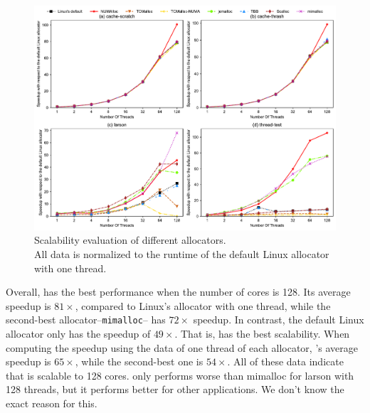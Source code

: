 \begin{figure}[!th]
    \centering
    \includegraphics[width=\textwidth]{figure/sythentic-scalobility-new.pdf}
    \caption{Scalability evaluation of different allocators.\\ All data is normalized to the runtime of the default Linux allocator with one thread.}
    \label{sythentic-scalability}
\end{figure}

Overall, \NM{} has the best performance when the number of cores is 128. Its average speedup is $81\times$, compared to Linux's allocator with one thread, while the second-best allocator--\texttt{mimalloc}-- has $72\times$ speedup. In contrast, the default Linux allocator only has the speedup of $49\times$. That is, \NM{} has the best scalability. When computing the speedup using the data of one thread of each allocator, \NM{}'s average speedup is $65\times$, while the second-best one is $54\times$. All of these data indicate that \NM{} is scalable to 128 cores. \NM{} only performs worse than mimalloc for larson with 128 threads, but it performs better for other applications. We don't know the exact reason for this.  


